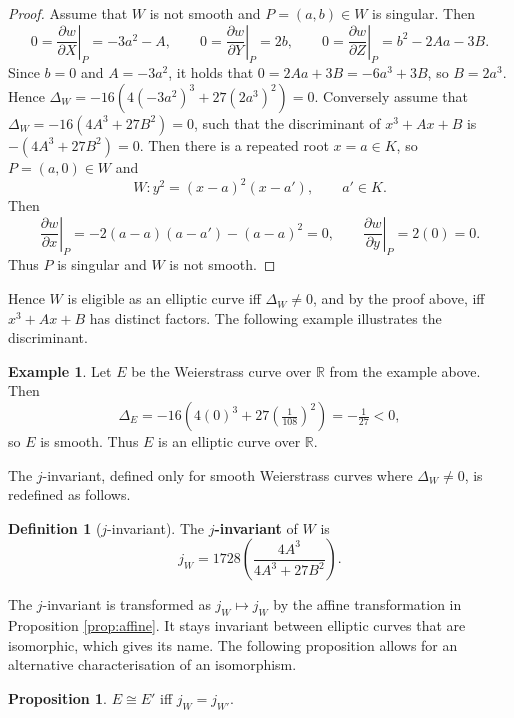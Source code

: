 \documentclass{article}
\newcommand{\R}{\mathbb{R}}
\newcommand{\val}[1]{\left. #1 \right\rvert}
\newcommand{\rb}[1]{\left( #1 \right)}
\theoremstyle{definition}\newtheorem*{definition}{Definition}
\theoremstyle{definition}\newtheorem*{example}{Example}
\theoremstyle{definition}\newtheorem*{remark}{Remark}
\newtheorem{proposition}{Proposition}[subsection]
\begin{document}
\begin{proof}
Assume that $ W $ is not smooth and $ P = \rb{a, b} \in W $ is singular. Then
$$ 0 = \val{\dfrac{\partial w}{\partial X}}_P = -3a^2 - A, \qquad 0 = \val{\dfrac{\partial w}{\partial Y}}_P = 2b, \qquad 0 = \val{\dfrac{\partial w}{\partial Z}}_P = b^2 - 2Aa - 3B. $$
Since $ b = 0 $ and $ A = -3a^2 $, it holds that $ 0 = 2Aa + 3B = -6a^3 + 3B $, so $ B = 2a^3 $. Hence $ \Delta_W = -16\rb{4\rb{-3a^2}^3 + 27\rb{2a^3}^2} = 0 $. Conversely assume that $ \Delta_W = -16\rb{4A^3 + 27B^2} = 0 $, such that the discriminant of $ x^3 + Ax + B $ is $ -\rb{4A^3 + 27B^2} = 0 $. Then there is a repeated root $ x = a \in K $, so $ P = \rb{a, 0} \in W $ and
$$ W : y^2 = \rb{x - a}^2\rb{x - a'}, \qquad a' \in K. $$
Then
$$ \val{\dfrac{\partial w}{\partial x}}_P = -2\rb{a - a}\rb{a - a'} - \rb{a - a}^2 = 0, \qquad \val{\dfrac{\partial w}{\partial y}}_P = 2\rb{0} = 0. $$
Thus $ P $ is singular and $ W $ is not smooth.
\end{proof}

Hence $ W $ is eligible as an elliptic curve iff $ \Delta_W \ne 0 $, and by the proof above, iff $ x^3 + Ax + B $ has distinct factors. The following example illustrates the discriminant.

\begin{example}
Let $ E $ be the Weierstrass curve over $ \R $ from the example above. Then
$$ \Delta_E = -16\rb{4\rb{0}^3 + 27\rb{\tfrac{1}{108}}^2} = -\tfrac{1}{27} < 0, $$
so $ E $ is smooth. Thus $ E $ is an elliptic curve over $ \R $.
\end{example}

The $ j $-invariant, defined only for smooth Weierstrass curves where $ \Delta_W \ne 0 $, is redefined as follows.

\begin{definition}[$ j $-invariant]
The \textbf{$ j $-invariant} of $ W $ is
$$ j_W = 1728\rb{\dfrac{4A^3}{4A^3 + 27B^2}}. $$
\end{definition}

The $ j $-invariant is transformed as $ j_W \mapsto j_W $ by the affine transformation in Proposition \ref{prop:affine}. It stays invariant between elliptic curves that are isomorphic, which gives its name. The following proposition allows for an alternative characterisation of an isomorphism.

\begin{proposition}
$ E \cong E' $ iff $ j_W = j_{W'} $.
\end{proposition}
\end{document}
